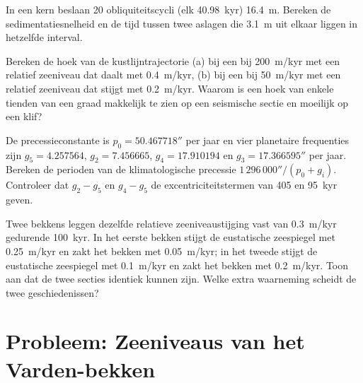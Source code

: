 \begin{exercise}[$\star\star$]\label{exo:b3:sequence-stratigraphy:9}
In een kern beslaan 20 obliquiteitscycli (elk \qty{40.98}{kyr})
\qty{16.4}{m}. Bereken de sedimentatiesnelheid en de tijd tussen twee aslagen die
\qty{3.1}{m} uit elkaar liggen in hetzelfde interval.
\end{exercise}

\begin{exercise}[$\star\star\star$]\label{exo:b3:sequence-stratigraphy:10}
Bereken de hoek van de kustlijntrajectorie (a) bij een  bij
\qty{200}{m/kyr} met een relatief zeeniveau dat daalt met \qty{0.4}{m/kyr}, (b) bij
een  bij \qty{50}{m/kyr} met een relatief zeeniveau dat stijgt met
\qty{0.2}{m/kyr}. Waarom is een hoek van enkele tienden van een graad makkelijk te zien op een
seismische sectie en moeilijk op een klif?
\end{exercise}

\begin{exercise}[$\star\star\star$]\label{exo:b3:sequence-stratigraphy:11}
De precessieconstante is $p_0 = 50.467718''$ per jaar en vier planetaire
frequenties zijn $g_5 = 4.257564$, $g_2 = 7.456665$, $g_4 = 17.910194$ en
$g_3 = 17.366595''$ per jaar. Bereken de perioden van de klimatologische precessie
$1\,296\,000''/(p_0 + g_i)$. Controleer dat $g_2 - g_5$ en $g_4 - g_5$ de
excentriciteitstermen van 405 en \qty{95}{kyr} geven.
\end{exercise}

\begin{exercise}[$\star\star\star$]\label{exo:b3:sequence-stratigraphy:12}
Twee bekkens leggen dezelfde relatieve zeeniveaustijging vast van \qty{0.3}{m/kyr} gedurende
\qty{100}{kyr}. In het eerste bekken stijgt de eustatische zeespiegel met \qty{0.25}{m/kyr} en
zakt het bekken met \qty{0.05}{m/kyr}; in het tweede stijgt de eustatische zeespiegel met
\qty{0.1}{m/kyr} en zakt het bekken met \qty{0.2}{m/kyr}. Toon aan dat de
twee secties identiek kunnen zijn. Welke extra waarneming scheidt de twee
geschiedenissen?
\end{exercise}

\section{Probleem: Zeeniveaus van het Varden-bekken}

